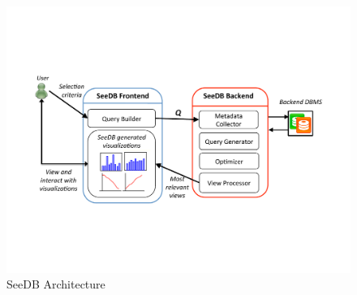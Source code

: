 \documentclass{sig-alternate}
\begin{document}
\author{
\alignauthor
\hspace{-30pt}Manasi Vartak  \\ 
 \\
\alignauthor 
\hspace{-80pt}Angela Zhang\\ 
 \\ 
\alignauthor
\hspace{-105pt}Aditya Parameswaran \\ 
 \\
\alignauthor 
\hspace{-130pt}Samuel Madden \\ 
 \\ 
}

\maketitle
\begin{abstract}

\end{abstract}






 

\begin{figure}[ht]
  \centering
  \includegraphics[width=\textwidth]{images/seedb-architecture.pdf}
  \caption{SeeDB Architecture}
  \label{fig:sys-arch}
\end{figure}
\end{document}
